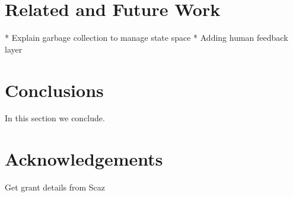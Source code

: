 \documentclass[letterpaper]{article}
\begin{document}
\section{Related and Future Work}
\label{sec:future}
	* Explain garbage collection to manage state space
	* Adding human feedback layer

\section{Conclusions}
\label{sec:conclusions}
In this section we conclude.

\section{Acknowledgements}
\label{sec:acknowledgements}
Get grant details from Scaz



\end{document}
